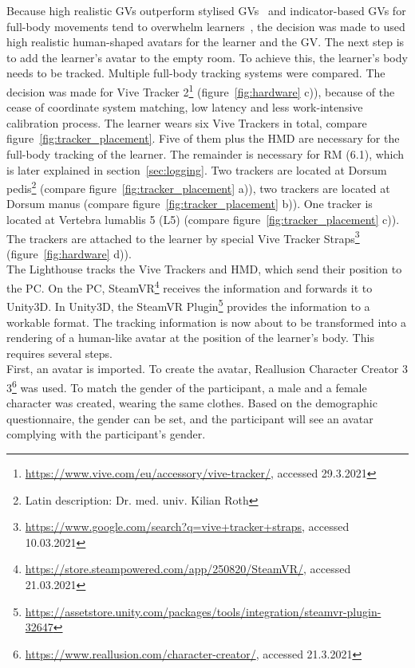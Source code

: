 Because high realistic GVs outperform stylised GVs~\cite{max} and indicator-based GVs for full-body movements tend to overwhelm learners~\cite{lightguide}, the decision was made to used high realistic human-shaped avatars for the learner and the GV. The next step is to add the learner's avatar to the empty room. To achieve this, the learner's body needs to be tracked. Multiple full-body tracking systems were compared. The decision was made for Vive Tracker 2\footnote{\href{https://www.vive.com/eu/accessory/vive-tracker/}{https://www.vive.com/eu/accessory/vive-tracker/}, accessed 29.3.2021} (figure~\ref{fig:hardware} c)), because of the cease of coordinate system matching, low latency and less work-intensive calibration process. The learner wears six Vive Trackers in total, compare figure~\ref{fig:tracker_placement}. Five of them plus the HMD are necessary for the full-body tracking of the learner. The remainder is necessary for RM (6.1), which is later explained in section~\ref{sec:logging}. Two trackers are located at Dorsum pedis\footnote{\label{fn:latin}Latin description: Dr. med. univ. Kilian Roth} (compare figure~\ref{fig:tracker_placement} a)), two trackers are located at Dorsum manus (compare figure~\ref{fig:tracker_placement} b)). One  tracker is located at Vertebra lumablis 5 (L5) (compare figure~\ref{fig:tracker_placement} c)). The trackers are attached to the learner by special Vive Tracker Straps\footnote{\href{https://www.google.com/search?q=vive+tracker+straps}{https://www.google.com/search?q=vive+tracker+straps}, accessed 10.03.2021} (figure~\ref{fig:hardware} d)).\\
The Lighthouse tracks the Vive Trackers and HMD, which send their position to the PC. On the PC, SteamVR\footnote{\href{https://store.steampowered.com/app/250820/SteamVR/}{https://store.steampowered.com/app/250820/SteamVR/}, accessed 21.03.2021} receives the information and forwards it to Unity3D. In Unity3D, the SteamVR Plugin\footnote{\href{https://assetstore.unity.com/packages/tools/integration/steamvr-plugin-32647}{https://assetstore.unity.com/packages/tools/integration/steamvr-plugin-32647}} provides the information to a workable format. The tracking information is now about to be transformed into a rendering of a human-like avatar at the position of the learner's body. This requires several steps.\\First, an avatar is imported. To create the avatar, Reallusion Character Creator 3 3\footnote{\href{https://www.reallusion.com/character-creator/}{https://www.reallusion.com/character-creator/}, accessed 21.3.2021} was used. To match the gender of the participant, a male and a female character was created, wearing the same clothes. Based on the demographic questionnaire, the gender can be set, and the participant will see an avatar complying with the participant's gender.\\
